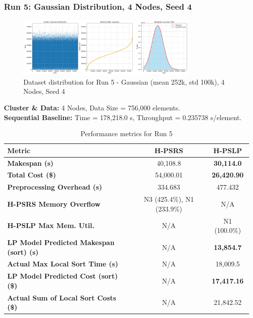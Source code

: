 \documentclass[]{interact}
\theoremstyle{plain}
\theoremstyle{definition}
\theoremstyle{remark}
\begin{document}
\subsubsection{Run 5: Gaussian Distribution, 4 Nodes, Seed 4}

\begin{figure}[H]
    \centering
    \includegraphics[width=0.8\textwidth]{src/out/5run_4node_4seed_gaussian.png}
    \caption{Dataset distribution for Run 5 - Gaussian (mean 252k, std 100k), 4 Nodes, Seed 4}
    \label{fig:run5_dist}
\end{figure}

\textbf{Cluster \& Data:} 4 Nodes, Data Size = 756,000 elements.\\
\textbf{Sequential Baseline:} Time = 178,218.0 \textmu{}s, Throughput = 0.235738 \textmu{}s/element.

\begin{table}[H]
\centering
\caption{Performance metrics for Run 5}
\label{tab:run5}
\begin{tabular}{@{}lcc@{}}
\toprule
\textbf{Metric} & \textbf{H-PSRS} & \textbf{H-PSLP} \\
\midrule
\textbf{Makespan (\textmu{}s)} & 40,108.8 & \textbf{30,114.0} \\
\textbf{Total Cost (\$)} & 54,000.01 & \textbf{26,420.90} \\
\textbf{Preprocessing Overhead (\textmu{}s)} & 334.683 & 477.432 \\
\textbf{H-PSRS Memory Overflow} & N3 (425.4\%), N1 (233.9\%) & N/A \\
\textbf{H-PSLP Max Mem. Util.} & N/A & N1 (100.0\%) \\
\textbf{LP Model Predicted Makespan (sort) (\textmu{}s)} & N/A & \textbf{13,854.7} \\
\textbf{Actual Max Local Sort Time (\textmu{}s)} & N/A & 18,009.5 \\
\textbf{LP Model Predicted Cost (sort) (\$)} & N/A & \textbf{17,417.16} \\
\textbf{Actual Sum of Local Sort Costs (\$)} & N/A & 21,842.52 \\
\bottomrule
\end{tabular}
\end{table}
\end{document}
